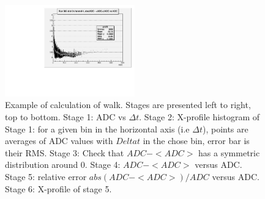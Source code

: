 \documentclass{article}
\begin{document}
\begin{figure}[htbp]
\includegraphics[width=0.5\textwidth]{walk_stage6}
\caption{Example of calculation of walk. Stages are presented left to right, top to bottom.
Stage 1: ADC vs $\Delta t$.
Stage 2: X-profile histogram of Stage 1: for a given bin in the horizontal axis (i.e $\Delta t$), points are averages of ADC values with $Delta t$ in the chose bin, error bar is their RMS.
Stage 3: Check that $ADC - <ADC>$ has a symmetric distribution around 0.
Stage 4: $ADC - <ADC>$ versus ADC.
Stage 5: relative error $abs(ADC - <ADC>)/ADC$ versus ADC.
Stage 6: X-profile of stage 5.}
\label{fig:walk_stages}
\end{figure}
\end{document}
